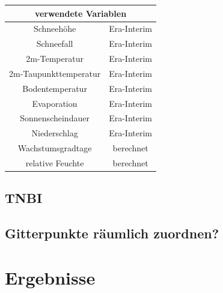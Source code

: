 \documentclass[]{article}
\begin{document}
\begin{tabular}{|c|c|}
	\multicolumn{2}{c}{verwendete Variablen}\\
	\hline
	Schneehöhe& Era-Interim\\
	\hline
	Schneefall& Era-Interim\\
	\hline
	2m-Temperatur& Era-Interim \\
	\hline
	2m-Taupunkttemperatur& Era-Interim\\
	\hline
	Bodentemperatur&Era-Interim\\
	\hline
	Evaporation& Era-Interim\\
	\hline
	Sonnenscheindauer& Era-Interim\\
	\hline
	Niederschlag& Era-Interim\\
	\hline
	Wachstumsgradtage& berechnet\\
	\hline
	relative Feuchte& berechnet\\
	\hline
\end{tabular}

\subsection{TNBI}
\subsection{Gitterpunkte räumlich zuordnen?}
\section{Ergebnisse}
\end{document}
